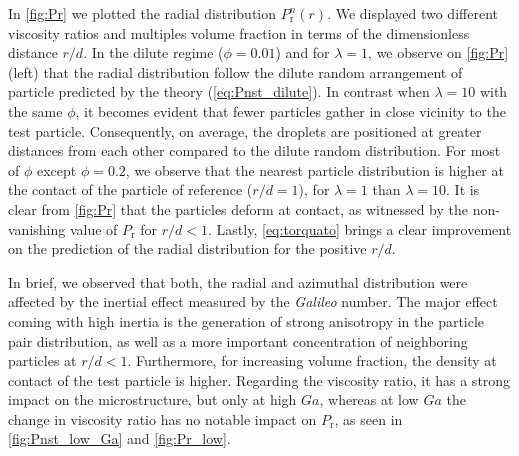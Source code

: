 In \ref{fig:Pr}  we plotted the radial distribution $P_\text{r}^n(r)$. %
We displayed two different viscosity ratios and multiples volume fraction in terms of the dimensionless distance $r/d$. 
In the dilute regime ($\phi = 0.01$) and for $\lambda=1$, we observe on \ref{fig:Pr} (left) that the radial distribution follow the dilute random arrangement of particle predicted by the theory (\ref{eq:Pnst_dilute}). 
In contrast when $\lambda = 10$ with the same $\phi$, it becomes evident that fewer particles gather in close vicinity to the test particle. Consequently, on average, the droplets are positioned at greater distances from each other compared to the dilute random distribution. 
For most of $\phi$ except $\phi=0.2$, we observe that the nearest particle distribution is higher at the contact of the particle of reference ($r/d = 1$), for $\lambda = 1$ than $\lambda = 10$. 
It is clear from \ref{fig:Pr} that the particles deform at contact, as witnessed by the non-vanishing value of $P_\text{r}$ for $r/d<1$.
Lastly, \ref{eq:torquato} brings a clear improvement on the prediction of the radial distribution for the positive $r/d$. 


In brief, we observed that both, the radial and azimuthal distribution were affected by the inertial effect measured by the \textit{Galileo} number. 
The major effect coming with high inertia is the generation of strong anisotropy in the particle pair distribution, as well as a more important concentration of neighboring particles at $r/d < 1$. 
Furthermore, for increasing volume fraction, the density at contact of the test particle is higher. 
Regarding the viscosity ratio, it has a strong impact on the microstructure, but only at high $Ga$, whereas at low $Ga$ the change in viscosity ratio has no notable impact on $P_\text{r}$, as seen in \ref{fig:Pnst_low_Ga} and \ref{fig:Pr_low}. 

